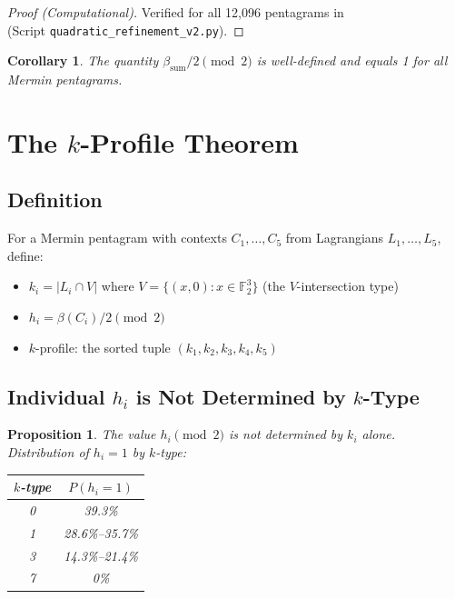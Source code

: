\documentclass[11pt,a4paper]{article}
\newtheorem{corollary}[theorem]{Corollary}
\newtheorem{proposition}[theorem]{Proposition}
\theoremstyle{remark}
\newcommand{\F}{\mathbb{F}}
\begin{document}
\begin{proof}[Proof (Computational)]
Verified for all 12{,}096 pentagrams in \cite{PaperXIsuppl}\\(Script \texttt{quadratic\_refinement\_v2.py}).
\end{proof}

\begin{corollary}\label{cor:parity}
The quantity $\beta_{\mathrm{sum}}/2 \pmod{2}$ is well-defined and equals 1 for all Mermin pentagrams.
\end{corollary}


\section{\texorpdfstring{The $k$-Profile Theorem}{The k-Profile Theorem}}\label{sec:kprofile}

\subsection{Definition}

For a Mermin pentagram with contexts $C_1, \ldots, C_5$ from Lagrangians $L_1, \ldots, L_5$, define:
\begin{itemize}
  \item $k_i = |L_i \cap V|$ where $V = \{(x,0) : x \in \F_2^3\}$ (the $V$-intersection type)
  \item $h_i = \beta(C_i)/2 \pmod{2}$
  \item $k$-profile: the sorted tuple $(k_1, k_2, k_3, k_4, k_5)$
\end{itemize}

\subsection{\texorpdfstring{Individual $h_i$ is Not Determined by $k$-Type}{Individual h-i is Not Determined by k-Type}}

\begin{proposition}\label{prop:h-varies}
The value $h_i \pmod{2}$ is not determined by $k_i$ alone.
Distribution of $h_i = 1$ by $k$-type:
\begin{center}
\begin{tabular}{cc}
\toprule
$k$-type & $P(h_i = 1)$ \\
\midrule
0 & 39.3\% \\
1 & 28.6\%--35.7\% \\
3 & 14.3\%--21.4\% \\
7 & 0\% \\
\bottomrule
\end{tabular}
\end{center}
\end{proposition}
\end{document}
